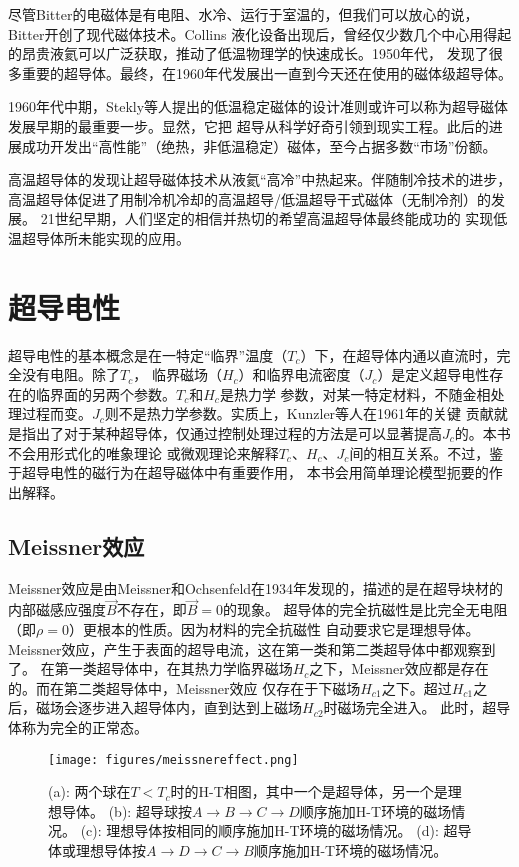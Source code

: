\begin{table}[htbp]
\end{table}

尽管Bitter的电磁体是有电阻、水冷、运行于室温的，但我们可以放心的说，Bitter开创了现代磁体技术。Collins
液化设备出现后，曾经仅少数几个中心用得起的昂贵液氦可以广泛获取，推动了低温物理学的快速成长。1950年代，
发现了很多重要的超导体。最终，在1960年代发展出一直到今天还在使用的磁体级超导体。

1960年代中期，Stekly等人提出的低温稳定磁体的设计准则或许可以称为超导磁体发展早期的最重要一步。显然，它把
超导从科学好奇引领到现实工程。此后的进展成功开发出“高性能”（绝热，非低温稳定）磁体，至今占据多数“市场”份额。

高温超导体的发现让超导磁体技术从液氦“高冷”中热起来。伴随制冷技术的进步，高温超导体促进了用制冷机冷却的高温超导/低温超导干式磁体（无制冷剂）的发展。
21世纪早期，人们坚定的相信并热切的希望高温超导体最终能成功的
实现低温超导体所未能实现的应用。

\section{超导电性}
超导电性的基本概念是在一特定“临界”温度（$T_c$）下，在超导体内通以直流时，完全没有电阻。除了$T_c$，
临界磁场（$H_c$）和临界电流密度（$J_c$）是定义超导电性存在的临界面的另两个参数。$T_c$和$H_c$是热力学
参数，对某一特定材料，不随金相处理过程而变。$J_c$则不是热力学参数。实质上，Kunzler等人在1961年的关键
贡献就是指出了对于某种超导体，仅通过控制处理过程的方法是可以显著提高$J_c$的。本书不会用形式化的唯象理论
或微观理论来解释$T_c$、$H_c$、$J_c$间的相互关系。不过，鉴于超导电性的磁行为在超导磁体中有重要作用，
本书会用简单理论模型扼要的作出解释。

\subsection{Meissner效应}
Meissner效应是由Meissner和Ochsenfeld在1934年发现的，描述的是在超导块材的内部磁感应强度$\vec{B}$不存在，即$\vec{B}=0$的现象。
超导体的完全抗磁性是比完全无电阻（即$\rho=0$）更根本的性质。因为材料的完全抗磁性
自动要求它是理想导体。Meissner效应，产生于表面的超导电流，这在第一类和第二类超导体中都观察到了。
在第一类超导体中，在其热力学临界磁场$H_c$之下，Meissner效应都是存在的。而在第二类超导体中，Meissner效应
仅存在于下磁场$H_{c1}$之下。超过$H_{c1}$之后，磁场会逐步进入超导体内，直到达到上磁场$H_{c2}$时磁场完全进入。
此时，超导体称为完全的正常态。
\begin{figure}
  \centering
 \texttt{[image: figures/meissnereffect.png]}
  \caption{
(a): 两个球在$T <T_c$时的H-T相图，其中一个是超导体，另一个是理想导体。
(b): 超导球按$ A\rightarrow B\rightarrow C\rightarrow D$顺序施加H-T环境的磁场情况。
(c): 理想导体按相同的顺序施加H-T环境的磁场情况。
(d): 超导体或理想导体按$A\rightarrow D\rightarrow C\rightarrow B$顺序施加H-T环境的磁场情况。}
\end{figure}

